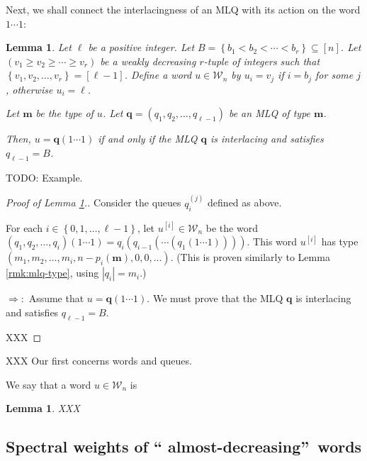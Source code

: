 \documentclass[reqno]{amsart}%
\newcommand{\0}{\phantom{c}}
\theoremstyle{plain}
\newtheorem{lemma}[thm]{Lemma}
\theoremstyle{definition}
\numberwithin{equation}{section}
\begin{document}
Next, we shall connect the interlacingness of an MLQ with its action on the
word $1\cdots1$:

\begin{lemma}
\label{lem:determinant_form.interl-act}Let $\ell$ be a positive integer. Let
$B=\left\{  b_{1}<b_{2}<\cdots<b_{r}\right\}  \subseteq\left[  n\right]  $.
Let $\left(  v_{1}\geq v_{2}\geq\dotsm\geq v_{r}\right)  $ be a weakly
decreasing $r$-tuple of integers such that $\left\{  v_{1},v_{2},\ldots
,v_{r}\right\}  =\left[  \ell-1\right]  $. Define a word $u\in\mathcal{W}_{n}$
by $u_{i}=v_{j}$ if $i=b_{j}$ for some $j$, otherwise $u_{i}=\ell$.

Let $\mathbf{m}$ be the type of $u$. Let $\mathbf{q}=\left(  q_{1}%
,q_{2},\ldots,q_{\ell-1}\right)  $ be an MLQ of type $\mathbf{m}$.

Then, $u=\mathbf{q}\left(  1\cdots1\right)  $ if and only if the MLQ
$\mathbf{q}$ is interlacing and satisfies $q_{\ell-1}=B$.
\end{lemma}

TODO: Example.

\begin{proof}
[Proof of Lemma \ref{lem:determinant_form.interl-act}.]Consider the queues
$q_{i}^{\left(  j\right)  }$ defined as above.

For each $i\in\left\{  0,1,\ldots,\ell-1\right\}  $, let $u^{\left[  i\right]
}\in\mathcal{W}_{n}$ be the word $\left(  q_{1},q_{2},\ldots,q_{i}\right)
\left(  1\cdots1\right)  =q_{i}\left(  q_{i-1}\left(  \cdots\left(
q_{1}\left(  1\cdots1\right)  \right)  \right)  \right)  $. This word
$u^{\left[  i\right]  }$ has type $\left(  m_{1},m_{2},\ldots,m_{i}%
,n-p_{i}\left(  \mathbf{m}\right)  ,0,0,\ldots\right)  $. (This is proven
similarly to Lemma \ref{rmk:mlq-type}, using $\left\vert q_{i}\right\vert
=m_{i}$.)

$\Longrightarrow:$ Assume that $u=\mathbf{q}\left(  1\cdots1\right)  $. We
must prove that the MLQ $\mathbf{q}$ is interlacing and satisfies $q_{\ell
-1}=B$.

XXX
\end{proof}

XXX Our first concerns words and queues.

We say that a word $u\in\mathcal{W}_{n}$ is

\begin{lemma}
\label{lem:determinant_form.1}XXX
\end{lemma}

\subsection{Spectral weights of \textquotedblleft
almost-decreasing\textquotedblright\ words}
\end{document}
